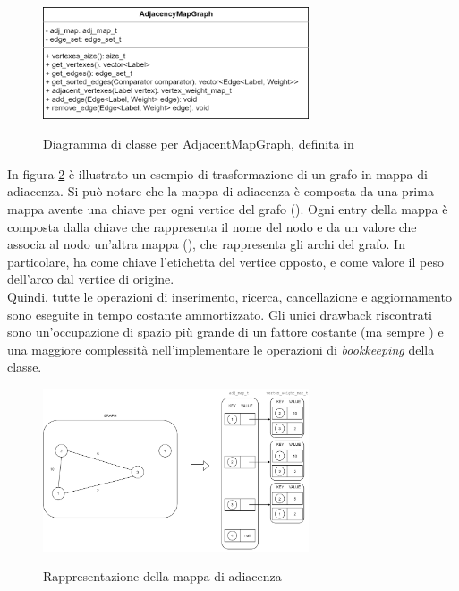 \begin{figure}[h]
	\caption{Diagramma di classe per AdjacentMapGraph, definita in }
	\centering
	\includegraphics[width=0.7\textwidth]{./images/AdjancencyMapGrapClass.png}
	\label{fig:AdjMapGraph Class}
\end{figure}

\noindent In figura \ref{fig:AdjMapGraph Abstract} è illustrato un esempio di trasformazione di un grafo in mappa di adiacenza. Si può notare che la mappa di adiacenza è composta da una prima mappa avente una chiave per ogni vertice del grafo (). Ogni entry della mappa è composta dalla chiave che rappresenta il nome del nodo e da un valore che associa al nodo un'altra mappa (), che rappresenta gli archi del grafo.
In particolare,  ha come chiave l'etichetta del vertice opposto, e come valore il peso dell'arco dal vertice di origine. \\

\noindent Quindi, tutte le operazioni di inserimento, ricerca, cancellazione e aggiornamento sono eseguite in tempo costante ammortizzato. Gli unici drawback riscontrati sono un'occupazione di spazio più grande di un fattore costante (ma sempre \complexityNPlusM{}) e una maggiore complessità nell'implementare le operazioni di \textit{bookkeeping} della classe. \\

\begin{figure}[h]
	\caption{Rappresentazione della mappa di adiacenza}
	\centering
	\includegraphics[width=0.7\textwidth]{./images/AdjMapGraphAbstract.png}
	\label{fig:AdjMapGraph Abstract}
\end{figure}

